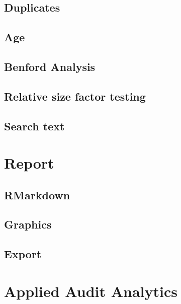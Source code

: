 \documentclass[
]{book}
\begin{document}
\hypertarget{duplicates}{%
\section{Duplicates}\label{duplicates}}

\hypertarget{age}{%
\section{Age}\label{age}}

\hypertarget{benford-analysis}{%
\section{Benford Analysis}\label{benford-analysis}}

\hypertarget{relative-size-factor-testing}{%
\section{Relative size factor testing}\label{relative-size-factor-testing}}

\hypertarget{test-searchtext}{%
\section{Search text}\label{test-searchtext}}

\hypertarget{report}{%
\chapter{Report}\label{report}}

\hypertarget{rmarkdown}{%
\section{RMarkdown}\label{rmarkdown}}

\hypertarget{graphics}{%
\section{Graphics}\label{graphics}}

\hypertarget{export}{%
\section{Export}\label{export}}

\hypertarget{applied-audit-analytics}{%
\chapter{Applied Audit Analytics}\label{applied-audit-analytics}}
\end{document}
